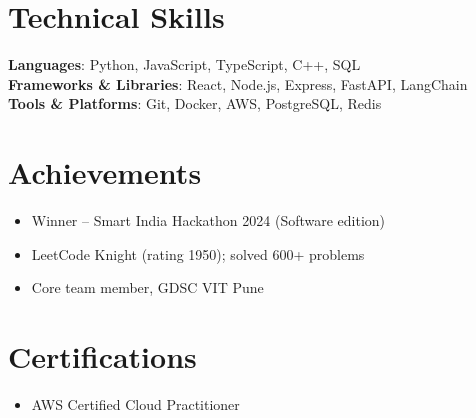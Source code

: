 \documentclass[letterpaper,11pt]{article}
\newcommand{\resumeItem}[1]{
  \item\small{
    {#1 \vspace{-2pt}}
  }
}
\begin{document}
\section{Technical Skills}
\begin{itemize}[leftmargin=0.15in, label={}]
    \small{\item{
     \textbf{Languages}{: Python, JavaScript, TypeScript, C++, SQL} \\
     \textbf{Frameworks \& Libraries}{: React, Node.js, Express, FastAPI, LangChain} \\
     \textbf{Tools \& Platforms}{: Git, Docker, AWS, PostgreSQL, Redis}
    }}
\end{itemize}

\section{Achievements}
\begin{itemize}[leftmargin=0.32in, itemsep=-2pt]
  \resumeItem{Winner -- Smart India Hackathon 2024 (Software edition)}
  \resumeItem{LeetCode Knight (rating 1950); solved 600+ problems}
  \resumeItem{Core team member, GDSC VIT Pune}
\end{itemize}

\section{Certifications}
\begin{itemize}[leftmargin=0.32in, itemsep=-2pt]
  \resumeItem{AWS Certified Cloud Practitioner}
\end{itemize}
\end{document}
